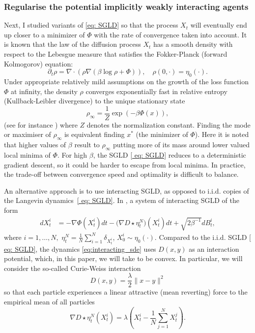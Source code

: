 \documentclass{article}
\begin{document}
\subsubsection{Regularise the potential implicitly weakly interacting agents}\label{sec: weakly interacting agents}

Next, I studied variants of \ref{eq: SGLD} so that the
process $X_{t}$ will eventually end up closer to a minimizer of $\Phi$ with the rate of convergence taken into account. It is known that the law of the diffusion process $X_{t}$
has a smooth density with respect to the Lebesgue measure that satisfies
the Fokker-Planck (forward Kolmogorov) equation: 
\[
\partial_{t}\rho=\nabla\cdot\left(\rho\nabla\left(\beta\log\rho+\Phi\right)\right),\quad\rho(0,\cdot)=\eta_{0}(\cdot).
\]
Under appropriate relatively mild assumptions on the growth of the loss function $\Phi$
at infinity, the density $\rho$ converges exponentially fast in relative
entropy (Kullback-Leibler divergence) to the unique stationary state
\[
\rho_{\infty}=\frac{1}{Z}\exp(-\beta\Phi(x)),
\]
(see for instance \cite[Ch. 4]{pavliotis2014stochastic}) where $Z$ denotes the normalization constant.
Finding the mode or maximiser of $\rho_{\infty}$ is equivalent finding
$x^{*}$ (the minimizer of $ \Phi$). Here it is noted that higher values of $ \beta$
result to $\rho_{\infty}$ putting more of its mass around lower valued
local minima of $\Phi$. For high $\beta$, the SGLD \ref{ eq: SGLD}
reduces to a deterministic gradient descent, so it could be harder
to escape from local minima. In practice, the trade-off between convergence
speed and optimality is difficult to balance.

An alternative approach is to use interacting SGLD, as opposed to
i.i.d. copies of the Langevin dynamics~\ref{ eq: SGLD}. In \cite{kantas2019sharpflatshallowweakly}, a system of interacting SGLD of the form 
\begin{align}
dX_{t}^{i} & =-\nabla\Phi(X_{t}^{i})dt-\big(\nabla D\star\eta_{t}^{N}\big)(X_{t}^{i})dt+\sqrt{2\beta^{-1}}dB_{t}^{i},\label{eq:interacting_sde}
\end{align}
where $i=1,\ldots,N,$ $\eta_{t}^{N}=\frac{1}{N}\sum_{i=1}^{N}\delta_{X_{t}^{i}}$,
$X_{0}^{i}\sim\eta_{0}(\cdot)$. Compared to the i.i.d. SGLD \ref{ eq: SGLD},
the dynamics \ref{eq:interacting_sde} uses $D(x,y)$ as an interaction
potential, which, in this paper, we will take to be convex. In particular,
we will consider the so-called Curie-Weiss interaction
\begin{equation}
D(x,y)=\frac{\lambda}{2}\|x-y\|^{2}\label{e:inter}
\end{equation}
so that each particle experiences a linear attractive (mean reverting)
force to the empirical mean of all particles 
\[
\nabla D\star\eta_{t}^{N}(X_{t}^{i})=\lambda\left(X_{t}^{i}-\frac{1}{N}\sum_{j=1}^{N}X_{t}^{j}\right).
\]
\end{document}
